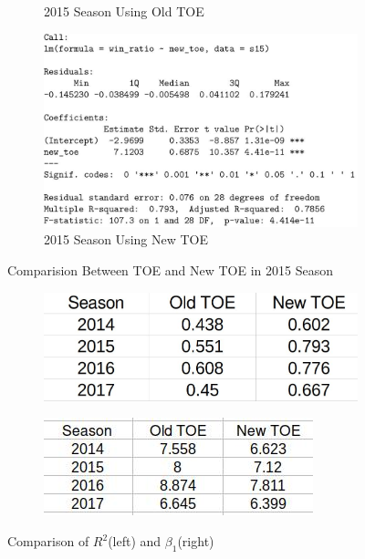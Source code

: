 \documentclass[11pt]{article}
\begin{document}
\begin{figure}[h!]
\begin{subfigure}[b]{0.42\linewidth}
    \caption{2015 Season Using Old TOE}
  \end{subfigure}
  \begin{subfigure}[b]{0.42\linewidth}
    \includegraphics[width=\linewidth]{15newsummary.jpg}
    \caption{2015 Season Using New TOE}
  \end{subfigure}
  \caption{Comparision Between TOE and New TOE in 2015 Season}
\end{figure}
\begin{figure}[h!]
\centering
 \begin{subfigure}[b]{0.4\linewidth}
  \includegraphics[width=\linewidth]{ComparisionR.jpg}
 \end{subfigure}
 \begin{subfigure}[b]{0.4\linewidth}
  \includegraphics[width =\linewidth]{Beta1.jpg}
\end{subfigure}
 \caption{Comparison of $R^2$(left) and $\beta_1$(right)}
\end{figure}
\end{document}
